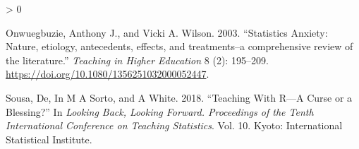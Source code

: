\documentclass[
]{article}
\newlength{\cslhangindent}
\newenvironment{CSLReferences}[2] %
 {%
  \setlength{\parindent}{0pt}
  \ifodd #1 \everypar{\setlength{\hangindent}{\cslhangindent}}\ignorespaces\fi
  \ifnum #2 > 0
  \setlength{\parskip}{#2\baselineskip}
  \fi
 }%
 {}
\begin{document}
\begin{CSLReferences}{1}{0}
\leavevmode\hypertarget{ref-Onwuegbuzie2003}{}%
Onwuegbuzie, Anthony J., and Vicki A. Wilson. 2003. {``{Statistics
Anxiety: Nature, etiology, antecedents, effects, and treatments--a
comprehensive review of the literature}.''} \emph{Teaching in Higher
Education} 8 (2): 195--209.
\url{https://doi.org/10.1080/1356251032000052447}.

\leavevmode\hypertarget{ref-Sousa2018}{}%
Sousa, De, In M A Sorto, and A White. 2018. {``{Teaching With R---A
Curse or a Blessing?}''} In \emph{Looking Back, Looking Forward.
Proceedings of the Tenth International Conference on Teaching
Statistics}. Vol. 10. Kyoto: International Statistical Institute.

\end{CSLReferences}
\end{document}
